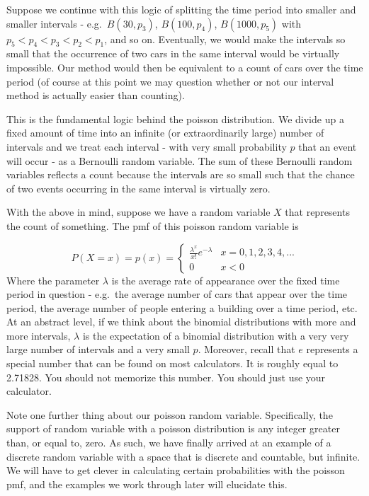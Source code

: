 \documentclass[
]{book}
\theoremstyle{definition}
\theoremstyle{definition}
\theoremstyle{definition}
\theoremstyle{definition}
\theoremstyle{remark}
\begin{document}
Suppose we continue with this logic of splitting the time period into smaller and smaller intervals - e.g.~\(B(30, p_3)\), \(B(100, p_4)\), \(B(1000, p_5)\) with \(p_5 < p_4 < p_3 < p_2 < p_1\), and so on. Eventually, we would make the intervals so small that the occurrence of two cars in the same interval would be virtually impossible. Our method would then be equivalent to a count of cars over the time period (of course at this point we may question whether or not our interval method is actually easier than counting).

This is the fundamental logic behind the poisson distribution. We divide up a fixed amount of time into an infinite (or extraordinarily large) number of intervals and we treat each interval - with very small probability \(p\) that an event will occur - as a Bernoulli random variable. The sum of these Bernoulli random variables reflects a count because the intervals are so small such that the chance of two events occurring in the same interval is virtually zero.

With the above in mind, suppose we have a random variable \(X\) that represents the count of something. The pmf of this poisson random variable is

\[
P(X = x) = p(x) = 
\begin{cases}
\frac{\lambda^x}{x!} e^{-\lambda} & x = 0,1,2,3,4,... \\
0 & x < 0 
\end{cases}
\label{eq:poisson}
\]
Where the parameter \(\lambda\) is the average rate of appearance over the fixed time period in question - e.g.~the average number of cars that appear over the time period, the average number of people entering a building over a time period, etc. At an abstract level, if we think about the binomial distributions with more and more intervals, \(\lambda\) is the expectation of a binomial distribution with a very very large number of intervals and a very small \(p\). Moreover, recall that \(e\) represents a special number that can be found on most calculators. It is roughly equal to 2.71828. You should not memorize this number. You should just use your calculator.

Note one further thing about our poisson random variable. Specifically, the support of random variable with a poisson distribution is any integer greater than, or equal to, zero. As such, we have finally arrived at an example of a discrete random variable with a space that is discrete and countable, but infinite. We will have to get clever in calculating certain probabilities with the poisson pmf, and the examples we work through later will elucidate this.
\end{document}

